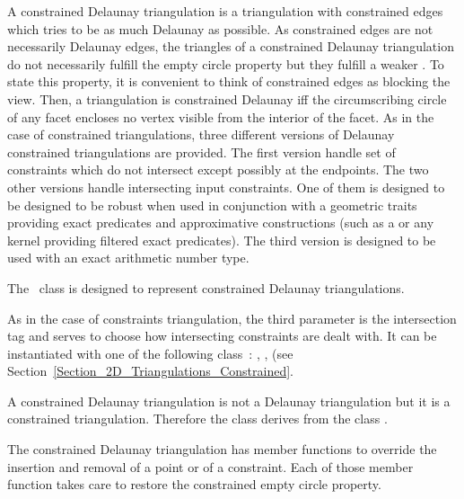 \label{Subsection_2D_Triangulations_Constrained_Delaunay_Description}
A constrained Delaunay triangulation is a triangulation with
constrained edges which tries to be as much Delaunay as possible.
As constrained edges are not necessarily Delaunay edges,
the triangles of a constrained Delaunay triangulation do not
necessarily fulfill the empty circle property
but they fulfill a weaker .
 To state this property,
it is convenient to think of  constrained
edges as blocking the view. Then, a triangulation is 
constrained Delaunay iff
 the circumscribing circle
of any facet encloses 
no vertex  visible
from the interior of the facet.
As in the case of constrained triangulations, three different versions
of Delaunay constrained triangulations are provided. The first version
handle set of constraints which do not intersect except possibly
at the endpoints. The two other versions 
handle intersecting input constraints. One of them
 is designed to be designed to be robust
when used in conjunction with a geometric traits
providing exact predicates and approximative constructions
(such as a  or any kernel providing
filtered exact predicates). The third version is designed to be used
with an exact arithmetic number type.




The \cgal\ class
is designed to represent
constrained Delaunay triangulations.

As in the case of constraints triangulation, the third parameter 
 is the intersection tag
and serves to choose how intersecting constraints
are dealt with. It can be instantiated with one of the following
class~: ,
,
(see Section~\ref{Section_2D_Triangulations_Constrained}.

A constrained Delaunay triangulation is not a Delaunay
triangulation but it is a constrained triangulation.
Therefore the class
derives from
the class .

The constrained Delaunay triangulation
has member functions to override the 
insertion and removal of a point or of a constraint.
Each of those member function takes care
to  restore
 the constrained empty circle
property.


